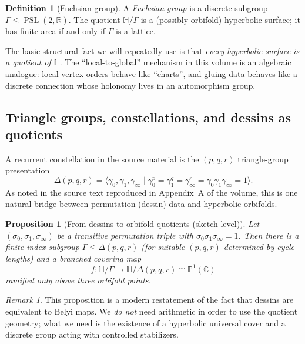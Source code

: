 \documentclass[11pt,oneside]{amsbook}
\numberwithin{equation}{section}
\theoremstyle{plain}
\newtheorem{proposition}[theorem]{Proposition}
\theoremstyle{definition}
\newtheorem{definition}[theorem]{Definition}
\theoremstyle{remark}
\newtheorem{remark}[theorem]{Remark}
\newcommand{\HH}{\mathbb{H}}
\newcommand{\R}{\mathbb{R}}
\newcommand{\C}{\mathbb{C}}
\DeclareMathOperator{\PSL}{\mathrm{PSL}}
\begin{document}
\begin{definition}[Fuchsian group]
A \emph{Fuchsian group} is a discrete subgroup $\Gamma\le \PSL(2,\R)$.
The quotient $\HH/\Gamma$ is a (possibly orbifold) hyperbolic surface; it has finite area if and only if $\Gamma$ is a lattice.
\end{definition}

The basic structural fact we will repeatedly use is that \emph{every hyperbolic surface is a quotient of $\HH$}.
The ``local-to-global'' mechanism in this volume is an algebraic analogue: local vertex orders behave like ``charts'', and gluing data behaves like a discrete connection whose holonomy lives in an automorphism group.

\subsection{Triangle groups, constellations, and dessins as quotients}
\label{sec:triangle_groups}

A recurrent constellation in the source material is the $(p,q,r)$ triangle-group presentation
\begin{equation}
\label{eq:triangle_group}
\Delta(p,q,r)=\langle \gamma_0,\gamma_1,\gamma_\infty \mid \gamma_0^p=\gamma_1^q=\gamma_\infty^r=\gamma_0\gamma_1\gamma_\infty=1\rangle.
\end{equation}
As noted in the source text reproduced in Appendix~A of the volume, this is one natural bridge between permutation (dessin) data and hyperbolic orbifolds.

\begin{proposition}[From dessins to orbifold quotients (sketch-level)]
\label{prop:dessin_to_orbifold}
Let $(\sigma_0,\sigma_1,\sigma_\infty)$ be a transitive permutation triple with $\sigma_0\sigma_1\sigma_\infty=1$.
Then there is a finite-index subgroup $\Gamma\le \Delta(p,q,r)$ (for suitable $(p,q,r)$ determined by cycle lengths) and a branched covering map
\[
f:\HH/\Gamma \to \HH/\Delta(p,q,r)\cong \mathbb{P}^1(\C)
\]
ramified only above three orbifold points.
\end{proposition}

\begin{remark}
This proposition is a modern restatement of the fact that dessins are equivalent to Belyi maps.
We \emph{do not} need arithmetic in order to use the quotient geometry; what we need is the existence of a hyperbolic universal cover and a discrete group acting with controlled stabilizers.
\end{remark}
\end{document}
